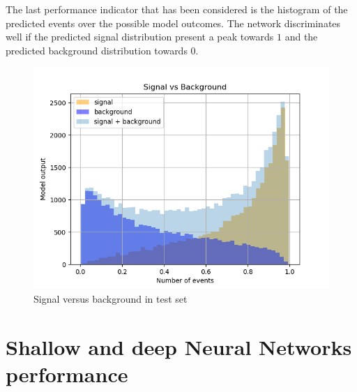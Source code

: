 The last performance indicator that has been considered is the histogram
of the predicted events over the possible model outcomes. The network
discriminates well if the predicted signal distribution present a peak
towards $1$ and the predicted background distribution towards $0$.
\begin{figure}[h]
 \centering
 \includegraphics[scale=0.4]{figures/svb.png}
 \caption{Signal versus background in test set}
\end{figure}

\section{Shallow and deep Neural Networks performance}

